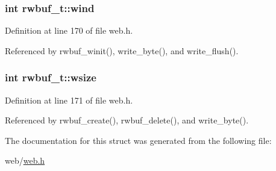 \subsubsection[{\texorpdfstring{wind}{wind}}]{\setlength{\rightskip}{0pt plus 5cm}int rwbuf\+\_\+t\+::wind}\hypertarget{structrwbuf__t_a135345eee44e93f37e57dbabec12c339}{}\label{structrwbuf__t_a135345eee44e93f37e57dbabec12c339}


Definition at line 170 of file web.\+h.



Referenced by rwbuf\+\_\+winit(), write\+\_\+byte(), and write\+\_\+flush().

\subsubsection[{\texorpdfstring{wsize}{wsize}}]{\setlength{\rightskip}{0pt plus 5cm}int rwbuf\+\_\+t\+::wsize}\hypertarget{structrwbuf__t_ac723cf150dd35d0f67ba7d38b18863ad}{}\label{structrwbuf__t_ac723cf150dd35d0f67ba7d38b18863ad}


Definition at line 171 of file web.\+h.



Referenced by rwbuf\+\_\+create(), rwbuf\+\_\+delete(), and write\+\_\+byte().



The documentation for this struct was generated from the following file\+:\begin{DoxyCompactItemize}
\item 
web/\hyperlink{web_8h}{web.\+h}\end{DoxyCompactItemize}
